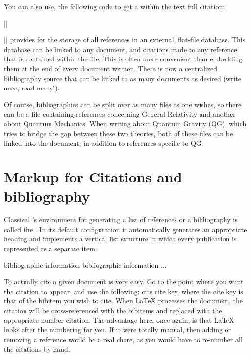 \begin{refsection}
You can also use, the following code to get a within the text full citation:


||



|\bibtex| provides for the storage of all references in an external, flat-file database. This database can be linked to any \latex document, and citations made to any reference that is contained within the file. This is often more convenient than embedding them at the end of every document written. There is now a centralized bibliography source that can be linked to as many documents as desired (write once, read many!). 

Of course, bibliographies can be split over as many files as one wishes, so there can be a file containing references concerning General Relativity and another about Quantum Mechanics. When writing about Quantum Gravity (QG), which tries to bridge the gap between these two theories, both of these files can be linked into the document, in addition to references specific to QG.

\section{Markup for Citations and bibliography}

Classical \latex's environment for generating a list of references or a bibliography is called
the . In its default configuration it automatically
generates an appropriate heading and implements a vertical list structure in which every publication is represented as a separate item.

\begin{teX}
\begin{thebibliography}{widest label}
 bibliographic information
 bibliographic information
      ...
\end{thebibliography}
\end{teX}

To actually cite a given document is very easy. Go to the point where you want the citation to appear, and use the following: cite cite key, where the cite key is that of the bibitem you wish to cite. When LaTeX processes the document, the citation will be cross-referenced with the bibitems and replaced with the appropriate number citation. The advantage here, once again, is that LaTeX looks after the numbering for you. If it were totally manual, then adding or removing a reference would be a real chore, as you would have to re-number all the citations by hand.


\end{refsection}

